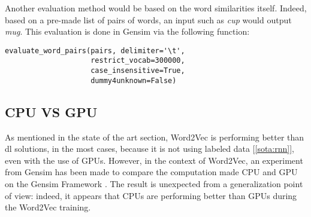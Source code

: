 Another evaluation method would be based on the word similarities itself. Indeed, based on a pre-made list of pairs of words, an input such as \textit{cup} would output \textit{mug}. This evaluation is done in Gensim via the following function:

\begin{lstlisting}
evaluate_word_pairs(pairs, delimiter='\t',
                    restrict_vocab=300000,
                    case_insensitive=True,
                    dummy4unknown=False)
\end{lstlisting}


\subsection{CPU VS GPU}
As mentioned in the state of the art section, Word2Vec is performing better than \gls{dl} solutions, in the most cases, because it is not using labeled data [\ref{sota:rnn}], even with the use of GPUs. However, in the context of Word2Vec, an experiment from Gensim has been made to compare the computation made CPU and GPU on the Gensim Framework \cite{article:word2vec-cpu-gpu}. The result is unexpected from a generalization point of view: indeed, it appears that CPUs are performing better than GPUs during the Word2Vec training.

